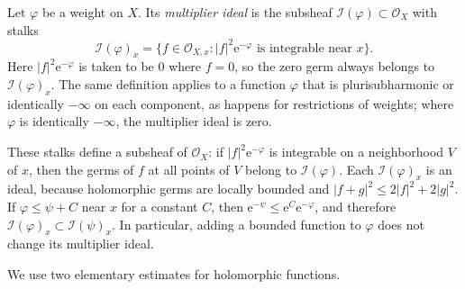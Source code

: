 \begin{definition}\label{def:multiplier-ideal}
Let $\varphi$ be a weight on $X$. Its \emph{multiplier ideal} is the subsheaf $\mathcal I(\varphi)\subset\mathcal O_X$ with stalks
\[
 \mathcal I(\varphi)_x
 =\{f\in\mathcal O_{X,x}: |f|^2\mathrm e^{-\varphi}
                              \text{ is integrable near }x\}.
\]
Here $|f|^2\mathrm e^{-\varphi}$ is taken to be $0$ where $f=0$, so the zero germ always belongs to $\mathcal I(\varphi)_x$. The same definition applies to a function $\varphi$ that is plurisubharmonic or identically $-\infty$ on each component, as happens for restrictions of weights; where $\varphi$ is identically $-\infty$, the multiplier ideal is zero.
\end{definition}

These stalks define a subsheaf of $\mathcal O_X$: if $|f|^2\mathrm e^{-\varphi}$ is integrable on a neighborhood $V$ of $x$, then the germs of $f$ at all points of $V$ belong to $\mathcal I(\varphi)$. Each $\mathcal I(\varphi)_x$ is an ideal, because holomorphic germs are locally bounded and $|f+g|^2\leq2|f|^2+2|g|^2$. If $\varphi\leq\psi+C$ near $x$ for a constant $C$, then $\mathrm e^{-\psi}\leq\mathrm e^{C}\mathrm e^{-\varphi}$, and therefore $\mathcal I(\varphi)_x\subset\mathcal I(\psi)_x$. In particular, adding a bounded function to $\varphi$ does not change its multiplier ideal.

We use two elementary estimates for holomorphic functions.

